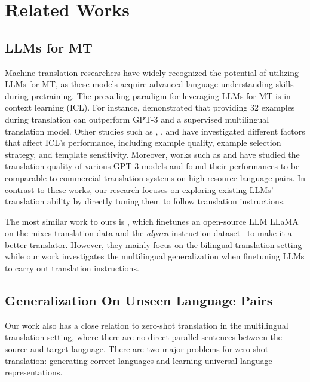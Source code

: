 \section{Related Works}

\subsection{LLMs for MT}
Machine translation researchers have widely recognized the potential of utilizing LLMs for MT, as these models acquire advanced language understanding skills during pretraining. The prevailing paradigm for leveraging LLMs for MT is in-context learning (ICL). For instance, \citet{lin-etal-2022-shot} demonstrated that providing 32 examples during translation can outperform GPT-3 and a supervised multilingual translation model. Other studies such as \citet{vilar-etal-2023-prompting}, \citet{agrawal-etal-2023-context}, and \citet{zhu2023multilingual} have investigated different factors that affect ICL's performance, including example quality, example selection strategy, and template sensitivity. Moreover, works such as \citet{hendy2023good} and \citet{jiao2023chatgpt} have studied the translation quality of various GPT-3 models and found their performances to be comparable to commercial translation systems on high-resource language pairs. In contrast to these works, our research focuses on exploring existing LLMs' translation ability by directly tuning them to follow translation instructions.


The most similar work to ours is \citet{jiao2023parrot}, which finetunes an open-source LLM LLaMA~\citep{touvron2023llama} on the mixes translation data and the \textit{alpaca} instruction dataset~\citep{alpaca} to make it a better translator. However, they mainly focus on the bilingual translation setting while our work investigates the multilingual generalization when finetuning LLMs to carry out translation instructions. 

\subsection{Generalization On Unseen Language Pairs}
Our work also has a close relation to zero-shot translation in the multilingual translation setting, where there are no direct parallel sentences between the source and target language. There are two major problems for zero-shot translation: generating correct languages and learning universal language representations. 

